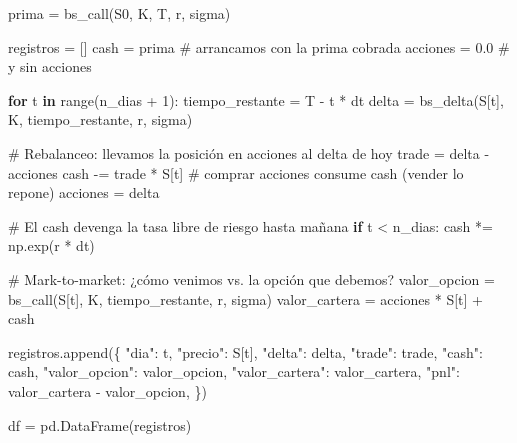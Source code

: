 \documentclass[
  spanish,
  letterpaper,
  DIV=11,
  numbers=noendperiod]{scrreprt}
\newenvironment{Shaded}{\begin{snugshade}}{\end{snugshade}}
\newcommand{\BuiltInTok}[1]{\textcolor[rgb]{0.00,0.23,0.31}{#1}}
\newcommand{\CommentTok}[1]{\textcolor[rgb]{0.37,0.37,0.37}{#1}}
\newcommand{\ControlFlowTok}[1]{\textcolor[rgb]{0.00,0.23,0.31}{\textbf{#1}}}
\newcommand{\DecValTok}[1]{\textcolor[rgb]{0.68,0.00,0.00}{#1}}
\newcommand{\FloatTok}[1]{\textcolor[rgb]{0.68,0.00,0.00}{#1}}
\newcommand{\KeywordTok}[1]{\textcolor[rgb]{0.00,0.23,0.31}{\textbf{#1}}}
\newcommand{\NormalTok}[1]{\textcolor[rgb]{0.00,0.23,0.31}{#1}}
\newcommand{\OperatorTok}[1]{\textcolor[rgb]{0.37,0.37,0.37}{#1}}
\newcommand{\StringTok}[1]{\textcolor[rgb]{0.13,0.47,0.30}{#1}}
\begin{document}
\label{delta-hedging}
\begin{Shaded}
\begin{Highlighting}[]
\NormalTok{prima }\OperatorTok{=}\NormalTok{ bs\_call(S0, K, T, r, sigma)}

\NormalTok{registros }\OperatorTok{=}\NormalTok{ []}
\NormalTok{cash }\OperatorTok{=}\NormalTok{ prima          }\CommentTok{\# arrancamos con la prima cobrada}
\NormalTok{acciones }\OperatorTok{=} \FloatTok{0.0}        \CommentTok{\# y sin acciones}

\ControlFlowTok{for}\NormalTok{ t }\KeywordTok{in} \BuiltInTok{range}\NormalTok{(n\_dias }\OperatorTok{+} \DecValTok{1}\NormalTok{):}
\NormalTok{    tiempo\_restante }\OperatorTok{=}\NormalTok{ T }\OperatorTok{{-}}\NormalTok{ t }\OperatorTok{*}\NormalTok{ dt}
\NormalTok{    delta }\OperatorTok{=}\NormalTok{ bs\_delta(S[t], K, tiempo\_restante, r, sigma)}

    \CommentTok{\# Rebalanceo: llevamos la posición en acciones al delta de hoy}
\NormalTok{    trade }\OperatorTok{=}\NormalTok{ delta }\OperatorTok{{-}}\NormalTok{ acciones}
\NormalTok{    cash }\OperatorTok{{-}=}\NormalTok{ trade }\OperatorTok{*}\NormalTok{ S[t]          }\CommentTok{\# comprar acciones consume cash (vender lo repone)}
\NormalTok{    acciones }\OperatorTok{=}\NormalTok{ delta}

    \CommentTok{\# El cash devenga la tasa libre de riesgo hasta mañana}
    \ControlFlowTok{if}\NormalTok{ t }\OperatorTok{\textless{}}\NormalTok{ n\_dias:}
\NormalTok{        cash }\OperatorTok{*=}\NormalTok{ np.exp(r }\OperatorTok{*}\NormalTok{ dt)}

    \CommentTok{\# Mark{-}to{-}market: ¿cómo venimos vs. la opción que debemos?}
\NormalTok{    valor\_opcion }\OperatorTok{=}\NormalTok{ bs\_call(S[t], K, tiempo\_restante, r, sigma)}
\NormalTok{    valor\_cartera }\OperatorTok{=}\NormalTok{ acciones }\OperatorTok{*}\NormalTok{ S[t] }\OperatorTok{+}\NormalTok{ cash}

\NormalTok{    registros.append(\{}
        \StringTok{"dia"}\NormalTok{: t, }\StringTok{"precio"}\NormalTok{: S[t], }\StringTok{"delta"}\NormalTok{: delta, }\StringTok{"trade"}\NormalTok{: trade,}
        \StringTok{"cash"}\NormalTok{: cash, }\StringTok{"valor\_opcion"}\NormalTok{: valor\_opcion,}
        \StringTok{"valor\_cartera"}\NormalTok{: valor\_cartera,}
        \StringTok{"pnl"}\NormalTok{: valor\_cartera }\OperatorTok{{-}}\NormalTok{ valor\_opcion,}
\NormalTok{    \})}

\NormalTok{df }\OperatorTok{=}\NormalTok{ pd.DataFrame(registros)}


\end{Highlighting}
\end{Shaded}
\end{document}
